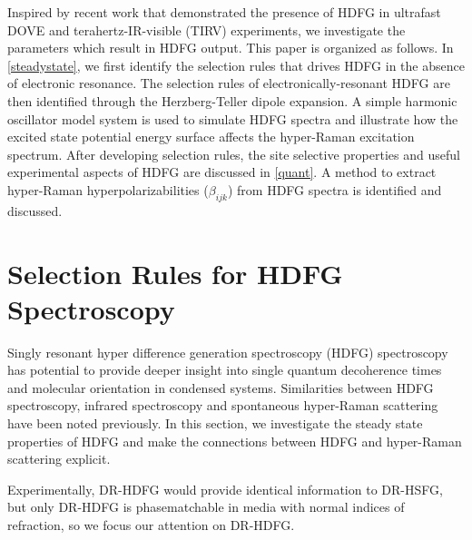 \documentclass[aip, jcp, reprint, onecolumn]{revtex4-2}
\begin{document}
Inspired by recent work that demonstrated the presence of HDFG in ultrafast DOVE and terahertz-IR-visible (TIRV) experiments, we investigate the parameters which result in HDFG output. \cite{Cho2000, Bonn2024, McDonnell2024}
This paper is organized as follows.
In \autoref{steadystate}, we first identify the selection rules that drives HDFG in the absence of electronic resonance. 
The selection rules of electronically-resonant HDFG are then identified through the Herzberg-Teller dipole expansion.
A simple harmonic oscillator model system is used to simulate HDFG spectra and illustrate how the excited state potential energy surface affects the hyper-Raman excitation spectrum.
After developing selection rules, the site selective properties and useful experimental aspects of HDFG are discussed in \autoref{quant}.
A method to extract hyper-Raman hyperpolarizabilities ($\beta_{ijk}$) from HDFG spectra is identified and discussed.

\section{Selection Rules for HDFG Spectroscopy}\label{steadystate}

Singly resonant hyper difference generation spectroscopy (HDFG) spectroscopy has potential to provide deeper insight into single quantum decoherence times and molecular orientation in condensed systems.
Similarities between HDFG spectroscopy, infrared spectroscopy and spontaneous hyper-Raman scattering have been noted previously. \cite{RN352, Bonn2024, McDonnell2024}
In this section, we investigate the steady state properties of HDFG and make the connections between HDFG and hyper-Raman scattering explicit.

Experimentally, DR-HDFG would provide identical information to DR-HSFG, but only DR-HDFG is phasematchable in media with normal indices of refraction,\cite{RN278} so we focus our attention on DR-HDFG. 
\end{document}

